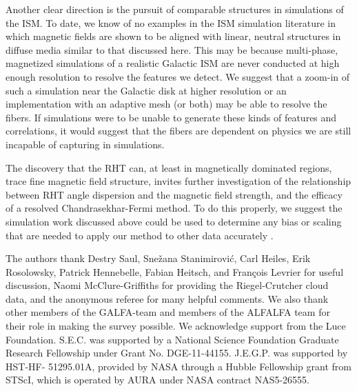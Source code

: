 Another clear direction is the pursuit of comparable structures in simulations of the ISM. To date, we know of no examples in the ISM simulation literature in which magnetic fields are shown to be aligned with linear, neutral structures in diffuse media similar to that discussed here. This may be because multi-phase, magnetized simulations of a realistic Galactic ISM \citep[e.~g.~][]{2012arXiv1202.0552H} are never conducted at high enough resolution to resolve the features we detect. We suggest that a zoom-in of such a simulation near the Galactic disk at higher resolution or an implementation with an adaptive mesh (or both) may be able to resolve the \hi fibers. If simulations were to be unable to generate these kinds of features and correlations, it would suggest that the fibers are dependent on physics we are still incapable of capturing in simulations.

The discovery that the RHT can, at least in magnetically dominated regions, trace fine magnetic field structure, invites further investigation of the relationship between RHT angle dispersion and the magnetic field strength, and the efficacy of a resolved Chandrasekhar-Fermi method. To do this properly, we suggest the simulation work discussed above could be used to determine any bias or scaling that are needed to apply our method to other data accurately \citep[as in][]{Heitsch:2001da}.


The authors thank Destry Saul, Sne\v zana Stanimirovi\' c, Carl Heiles, Erik Rosolowsky, Patrick Hennebelle, Fabian Heitsch, and Fran\c cois Levrier for useful discussion, Naomi McClure-Griffiths for providing the Riegel-Crutcher cloud data, and the anonymous referee for many helpful comments. We also thank other members of the GALFA-\hi team and members of the ALFALFA team for their role in making the survey possible.
We acknowledge support from the Luce Foundation. S.E.C. was supported by a National Science Foundation Graduate Research Fellowship under Grant No. DGE-11-44155. J.E.G.P. was supported by HST-HF- 51295.01A, provided by NASA through a Hubble Fellowship grant from STScI, which is operated by AURA under NASA contract NAS5-26555.